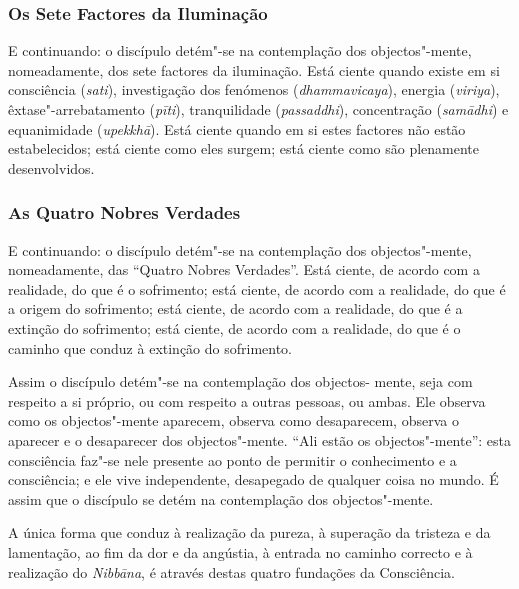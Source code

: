 \subsubsection{Os Sete Factores da Iluminação}


E continuando: o discípulo detém"-se na contemplação dos objectos"-mente,
nomeadamente, dos sete factores da iluminação. Está ciente quando existe em si
consciência (\emph{sati}), investigação dos fenómenos (\emph{dhammavicaya}),
energia (\emph{viriya}), êxtase"-arrebatamento (\emph{pīti}), tranquilidade
(\emph{passaddhi}), concentração (\emph{samādhi}) e equanimidade
(\emph{upekkhā}). Está ciente quando em si estes factores não estão
estabelecidos; está ciente como eles surgem; está ciente como são plenamente
desenvolvidos.

\subsubsection{As Quatro Nobres Verdades}


E continuando: o discípulo detém"-se na contemplação dos objectos"-mente,
nomeadamente, das “Quatro Nobres Verdades”. Está ciente, de acordo com a
realidade, do que é o sofrimento; está ciente, de acordo com a realidade, do que
é a origem do sofrimento; está ciente, de acordo com a realidade, do que é a
extinção do sofrimento; está ciente, de acordo com a realidade, do que é o
caminho que conduz à extinção do sofrimento.

Assim o discípulo detém"-se na contemplação dos objectos- mente, seja com
respeito a si próprio, ou com respeito a outras pessoas, ou ambas. Ele observa
como os objectos"-mente aparecem, observa como desaparecem, observa o aparecer e
o desaparecer dos objectos"-mente. “Ali estão os objectos"-mente”: esta
consciência faz"-se nele presente ao ponto de permitir o conhecimento e a
consciência; e ele vive independente, desapegado de qualquer coisa no mundo. É
assim que o discípulo se detém na contemplação dos objectos"-mente.

A única forma que conduz à realização da pureza, à superação da tristeza e da
lamentação, ao fim da dor e da angústia, à entrada no caminho correcto e à
realização do \emph{Nibbāna}, é através destas quatro fundações da Consciência.


